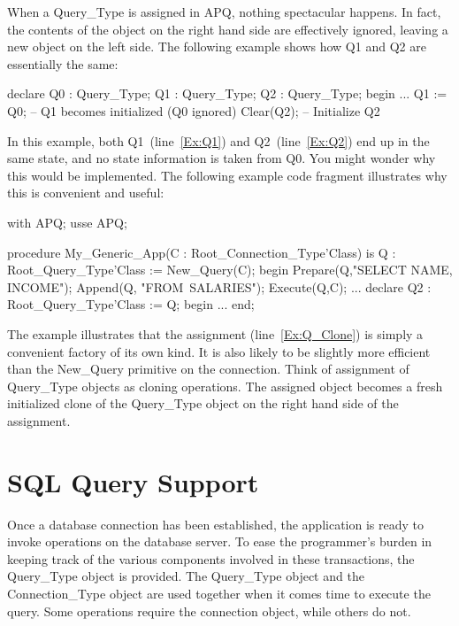 \documentclass[english,letterpaper]{book}
\begin{document}
When a Query\_Type is assigned in APQ, nothing spectacular happens.
In fact, the contents of the object on the right hand side are effectively
ignored, leaving a new object on the left side. The following example
shows how Q1 and Q2 are essentially the same:

\begin{NumberedExample}
declare
   Q0 : Query_Type;
   Q1 : Query_Type;
   Q2 : Query_Type;
begin
   ...
   Q1 := Q0;   -- Q1 becomes initialized (Q0 ignored)\label{Ex:Q1}
   Clear(Q2);  -- Initialize Q2\label{Ex:Q2}
\end{NumberedExample}

In this example, both Q1~(line~\ref{Ex:Q1}) and Q2~(line~\ref{Ex:Q2})
end up in the same state, and no state information is taken from Q0. You
might wonder why this would be implemented. The following example code
fragment illustrates why this is convenient and useful:

\begin{NumberedExample}
with APQ;
usse APQ;

procedure My_Generic_App(C : Root_Connection_Type'Class) is
   Q : Root_Query_Type'Class := New_Query(C);
begin
   Prepare(Q,"SELECT NAME, INCOME");
   Append(Q, "FROM~SALARIES");
   Execute(Q,C);
   ...
   declare
      Q2 : Root_Query_Type'Class := Q;\label{Ex:Q_Clone}
   begin
      ...
   end;
\end{NumberedExample}

The example illustrates that the assignment (line~\ref{Ex:Q_Clone}) is
simply a convenient factory of its own kind. It is also likely to be
slightly more efficient than the New\_Query primitive on the
connection. Think of assignment of Query\_Type objects as cloning
operations. The assigned object becomes a fresh initialized clone of the
Query\_Type object on the right hand side of the assignment.

\chapter{SQL Query Support}

Once a database connection has been established, the application is
ready to invoke operations on the database server. To ease the programmer's
burden in keeping track of the various components involved in these
transactions, the Query\_Type object is provided. The Query\_Type
object and the Connection\_Type object are used together when it comes
time to execute the query. Some operations require the connection
object, while others do not.
\end{document}
